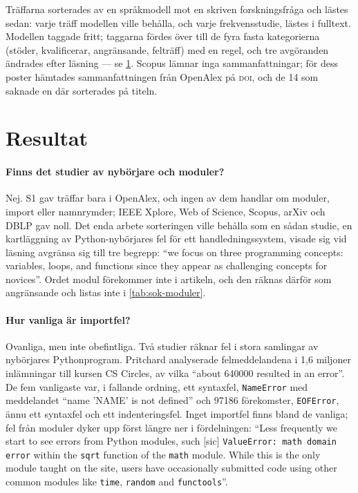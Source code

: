 Träffarna sorterades av en språkmodell mot en skriven forskningsfråga
och lästes sedan: varje träff modellen ville behålla, och varje
frekvensstudie, lästes i fulltext.  Modellen taggade fritt; taggarna
fördes över till de fyra fasta kategorierna (stöder, kvalificerar,
angränsande, felträff) med en regel, och tre avgöranden ändrades efter
läsning --- se \cref{sec:mod-resultat}.  Scopus lämnar inga
sammanfattningar; för dess poster hämtades sammanfattningen från
OpenAlex på \textsc{doi}, och de 14 som saknade en där sorterades på
titeln.

\section{Resultat}
\label{sec:mod-resultat}

\paragraph{Finns det studier av nybörjare och moduler?}
Nej.  S1 gav träffar bara i OpenAlex, och ingen av dem handlar om
moduler, import eller namnrymder; IEEE Xplore, Web of Science, Scopus,
arXiv och DBLP gav noll.  Det enda arbete sorteringen ville behålla som en sådan studie,
en kartläggning av Python-nybörjares fel för ett handledningssystem,
visade sig vid läsning avgränsa sig till tre begrepp: \enquote{we focus
on three programming concepts: variables, loops, and functions since
they appear as challenging concepts for
novices}\autocite[226]{VanDerHeyden2025}.  Ordet modul förekommer inte i
artikeln, och den räknas därför som angränsande och listas inte i
\cref{tab:sok-moduler}.

\paragraph{Hur vanliga är importfel?}
Ovanliga, men inte obefintliga.  Två studier räknar fel i stora
samlingar av nybörjares Pythonprogram.  Pritchard analyserade
felmeddelandena i 1,6 miljoner inlämningar till kursen CS Circles, av
vilka \enquote{about 640000 resulted in an
error}\autocite[avsnitt~2]{Pritchard2015}.  De fem vanligaste var, i
fallande ordning, ett syntaxfel, \texttt{NameError} med
meddelandet \enquote{name 'NAME' is not defined} och \num{97186}
förekomster, \texttt{EOFError}, ännu ett syntaxfel och ett
indenteringsfel\autocite[avsnitt~2.1]{Pritchard2015}.  Inget importfel
finns bland de vanliga; fel från moduler dyker upp först längre ner i
fördelningen: \enquote{Less frequently we start to see errors from
Python modules, such [sic] \texttt{ValueError: math domain error} within
the \texttt{sqrt} function of the \texttt{math} module.  While this is the
only module taught on the site, users have occasionally submitted code
using other common modules like \texttt{time}, \texttt{random} and
\texttt{functools}}\autocite[avsnitt~3]{Pritchard2015}.

